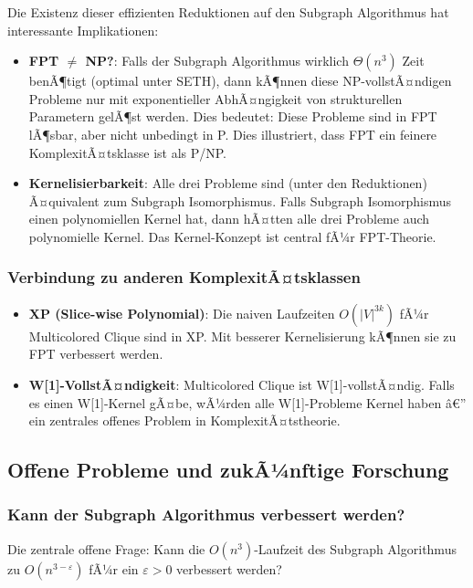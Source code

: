 ﻿\documentclass[a4paper,12pt]{article}
\theoremstyle{definition}
\begin{document}
Die Existenz dieser effizienten Reduktionen auf den Subgraph Algorithmus hat interessante Implikationen:

\begin{itemize}
	\item \textbf{FPT $\neq$ NP?}: Falls der Subgraph Algorithmus wirklich $\Theta(n^3)$ Zeit benÃ¶tigt (optimal unter SETH), dann kÃ¶nnen diese NP-vollstÃ¤ndigen Probleme nur mit exponentieller AbhÃ¤ngigkeit von strukturellen Parametern gelÃ¶st werden. Dies bedeutet: Diese Probleme sind in FPT lÃ¶sbar, aber nicht unbedingt in P. Dies illustriert, dass FPT ein feinere KomplexitÃ¤tsklasse ist als P/NP.
	
	\item \textbf{Kernelisierbarkeit}: Alle drei Probleme sind (unter den Reduktionen) Ã¤quivalent zum Subgraph Isomorphismus. Falls Subgraph Isomorphismus einen polynomiellen Kernel hat, dann hÃ¤tten alle drei Probleme auch polynomielle Kernel. Das Kernel-Konzept ist central fÃ¼r FPT-Theorie.
\end{itemize}

\subsubsection{Verbindung zu anderen KomplexitÃ¤tsklassen}

\begin{itemize}
	\item \textbf{XP (Slice-wise Polynomial)}: Die naiven Laufzeiten $O(|V|^{3k})$ fÃ¼r Multicolored Clique sind in XP. Mit besserer Kernelisierung kÃ¶nnen sie zu FPT verbessert werden.
	
	\item \textbf{W[1]-VollstÃ¤ndigkeit}: Multicolored Clique ist W[1]-vollstÃ¤ndig. Falls es einen W[1]-Kernel gÃ¤be, wÃ¼rden alle W[1]-Probleme Kernel haben â€” ein zentrales offenes Problem in KomplexitÃ¤tstheorie.
\end{itemize}

\subsection{Offene Probleme und zukÃ¼nftige Forschung}

\subsubsection{Kann der Subgraph Algorithmus verbessert werden?}

Die zentrale offene Frage: Kann die $O(n^3)$-Laufzeit des Subgraph Algorithmus zu $O(n^{3-\varepsilon})$ fÃ¼r ein $\varepsilon > 0$ verbessert werden?
\end{document}
